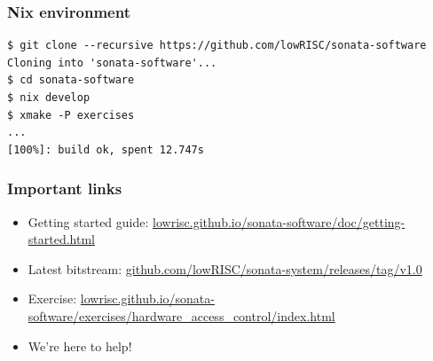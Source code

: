 \begin{frame}
  \frametitle{Nix environment}

\begin{verbatim}
$ git clone --recursive https://github.com/lowRISC/sonata-software
Cloning into 'sonata-software'...
$ cd sonata-software
$ nix develop
$ xmake -P exercises
...
[100%]: build ok, spent 12.747s
\end{verbatim}

\end{frame}

\begin{frame}
  \frametitle{Important links}

  \begin{itemize}
    \item Getting started guide: \url{lowrisc.github.io/sonata-software/doc/getting-started.html}
    \item Latest bitstream: \url{github.com/lowRISC/sonata-system/releases/tag/v1.0}
    \item Exercise: \url{lowrisc.github.io/sonata-software/exercises/hardware_access_control/index.html}
    \item We're here to help!
  \end{itemize}
\end{frame}

